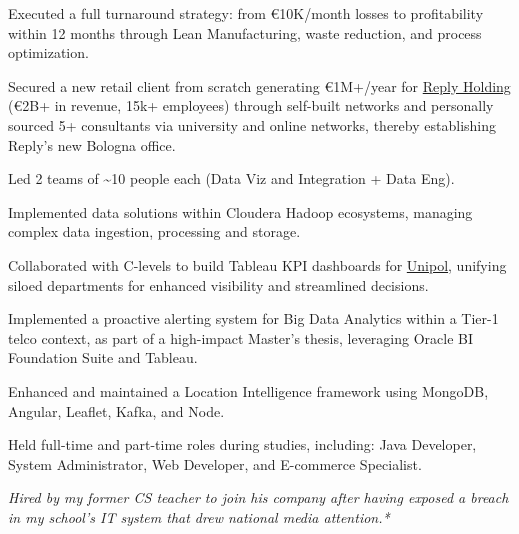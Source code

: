 \documentclass[]{deedy-resume-cv}
\begin{document}
\begin{minipage}[t]{0.60\textwidth}
\begin{tightemize}
\item Executed a full turnaround strategy: from €10K/month losses to profitability within 12 months through Lean Manufacturing, waste reduction, and process optimization.
\end{tightemize}

\sectionsep
{}
\begin{tightemize}
\item Secured a new retail client from scratch generating €1M+/year for \href{https://www.reply.com}{Reply Holding} (€2B+ in revenue, 15k+ employees) through self-built networks and personally sourced 5+ consultants via university and online networks, thereby establishing Reply's new Bologna office.

\item Led 2 teams of \~{}10 people each (Data Viz and Integration + Data Eng).

\item Implemented data solutions within Cloudera Hadoop ecosystems, managing complex data ingestion, processing and storage.

\item Collaborated with C-levels to build Tableau KPI dashboards for \href{https://www.unipol.it/}{Unipol}, unifying siloed departments for enhanced visibility and streamlined decisions.
\end{tightemize}

\sectionsep
{}
\begin{tightemize}
\item Implemented a proactive alerting system for Big Data Analytics within a Tier-1 telco context, as part of a high-impact Master's thesis, leveraging Oracle BI Foundation Suite and Tableau.
\item Enhanced and maintained a Location Intelligence framework using MongoDB, Angular, Leaflet, Kafka, and Node. 
\end{tightemize}

\sectionsep
{}
Held full-time and part-time roles during studies, including: Java Developer, System Administrator, Web Developer, and E-commerce Specialist.

\sectionsep
{}
\small{\textit{Hired by my former CS teacher to join his company after having exposed a breach in my school's IT system that drew national media attention.*}}

%
%
\end{minipage}
\end{document}
